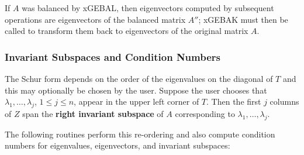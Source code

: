 \begin{enumerate}
\end{enumerate}

If $A$ was balanced by xGEBAL, then eigenvectors computed by subsequent
operations are eigenvectors of the balanced matrix $A''$;
xGEBAK must then be called
to transform them back to eigenvectors of the original matrix $A$.

\subsubsection{Invariant Subspaces and Condition Numbers}

The Schur form depends on the order of the eigenvalues on the diagonal
of $T$ and this may optionally be chosen by the user. Suppose the user chooses
that $\lambda_1 , \ldots , \lambda_j$, $1 \leq j \leq n$, appear in the upper left
corner of $T$. Then the first $j$ columns of $Z$ span the {\bf right invariant
subspace} of $A$ corresponding to $\lambda_1 , \ldots , \lambda_j$.

The following routines perform this re-ordering and also
compute condition numbers for eigenvalues, eigenvectors,
and invariant subspaces:

